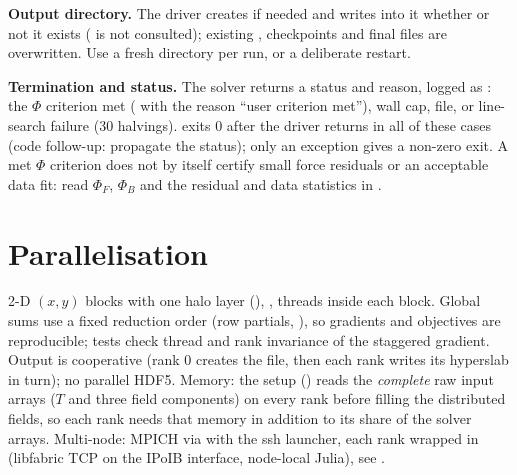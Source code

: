 \textbf{Output directory.} The driver creates  if needed and writes into it whether or not it exists
( is not consulted); existing , checkpoints and final files are overwritten. Use a fresh
directory per run, or a deliberate restart.

\textbf{Termination and status.} The solver returns a status and reason, logged as : the $\Phi$ criterion met ( with the reason ``user criterion met''), wall cap, 
file, or line-search failure (30 halvings).  exits 0 after the driver returns in all of these cases
(code follow-up: propagate the status); only an exception gives a non-zero exit. A met $\Phi$ criterion does not by itself
certify small force residuals or an acceptable data fit: read $\Phi_F$, $\Phi_B$ and the residual and data statistics in
.

\section{Parallelisation}
2-D $(x,y)$ blocks with one halo layer (), , threads inside each block.
Global sums use a fixed reduction order (row partials, ), so gradients and objectives are
reproducible; tests check thread and rank invariance of the staggered gradient. Output is cooperative (rank 0 creates the
file, then each rank writes its hyperslab in turn); no parallel HDF5. Memory: the setup () reads the
\emph{complete} raw input arrays ($T$ and three field components) on every rank before filling the distributed fields, so
each rank needs that memory in addition to its share of the solver arrays. Multi-node: MPICH via  with the ssh
launcher, each rank wrapped in  (libfabric TCP on the IPoIB interface, node-local Julia), see
.

